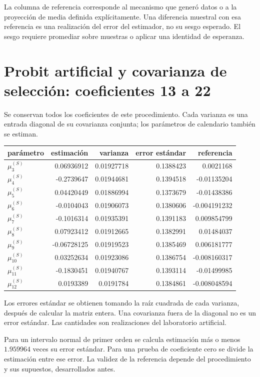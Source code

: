 \documentclass[11pt,a4paper]{article}
\begin{document}
La columna de referencia corresponde al mecanismo que generó datos o a la proyección de media definida explícitamente. Una diferencia muestral con esa referencia es una realización del error del estimador, no su sesgo esperado. El sesgo requiere promediar sobre muestras o aplicar una identidad de esperanza.

\clearpage
\section{Probit artificial y covarianza de selección: coeficientes 13 a 22}
Se conservan todos los coeficientes de este procedimiento. Cada varianza es una entrada diagonal de su covarianza conjunta; los parámetros de calendario también se estiman.
\begin{center}\small
\begin{tabular}{lrrrr}
\toprule
parámetro & estimación & varianza & error estándar & referencia\\\midrule
$\mu_3^{(S)}$ & 0.06936912 & 0.01927718 & 0.1388423 & 0.0021168\\
$\mu_4^{(S)}$ & -0.2739647 & 0.01944681 & 0.1394518 & -0.01135204\\
$\mu_5^{(S)}$ & 0.04420449 & 0.01886994 & 0.1373679 & -0.01438386\\
$\mu_6^{(S)}$ & -0.0104043 & 0.01906073 & 0.1380606 & -0.004191232\\
$\mu_7^{(S)}$ & -0.1016314 & 0.01935391 & 0.1391183 & 0.009854799\\
$\mu_8^{(S)}$ & 0.07923412 & 0.01912665 & 0.1382991 & 0.01484037\\
$\mu_9^{(S)}$ & -0.06728125 & 0.01919523 & 0.1385469 & 0.006181777\\
$\mu_10^{(S)}$ & 0.03252634 & 0.01923086 & 0.1386754 & -0.008160317\\
$\mu_11^{(S)}$ & -0.1830451 & 0.01940767 & 0.1393114 & -0.01499985\\
$\mu_12^{(S)}$ & 0.0193389 & 0.0191784 & 0.1384861 & -0.008048594\\
\bottomrule
\end{tabular}\end{center}

Los errores estándar se obtienen tomando la raíz cuadrada de cada varianza, después de calcular la matriz entera. Una covarianza fuera de la diagonal no es un error estándar. Las cantidades son realizaciones del laboratorio artificial.

Para un intervalo normal de primer orden se calcula estimación más o menos $1.959964$ veces su error estándar. Para una prueba de coeficiente cero se divide la estimación entre ese error. La validez de la referencia depende del procedimiento y sus supuestos, desarrollados antes.
\end{document}
